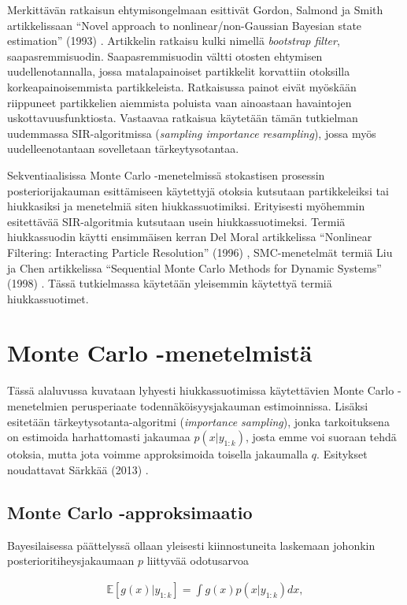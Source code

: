 \documentclass[
  12pt,
  a4paper, twoside]{book}
\begin{document}
Merkittävän ratkaisun ehtymisongelmaan esittivät Gordon, Salmond ja Smith artikkelissaan ``Novel approach to nonlinear/non-Gaussian Bayesian state estimation'' (1993) \citep{Gordon-1993}. Artikkelin ratkaisu kulki nimellä \emph{bootstrap filter}, saapasremmisuodin. Saapasremmisuodin vältti otosten ehtymisen uudellenotannalla, jossa matalapainoiset partikkelit korvattiin otoksilla korkeapainoisemmista partikkeleista. Ratkaisussa painot eivät myöskään riippuneet partikkelien aiemmista poluista vaan ainoastaan havaintojen uskottavuusfunktiosta. Vastaavaa ratkaisua käytetään tämän tutkielman uudemmassa SIR-algoritmissa (\emph{sampling importance resampling}), jossa myös uudelleenotantaan sovelletaan tärkeytysotantaa.

Sekventiaalisissa Monte Carlo -menetelmissä stokastisen prosessin posteriorijakauman esittämiseen käytettyjä otoksia kutsutaan partikkeleiksi tai hiukkasiksi ja menetelmiä siten hiukkassuotimiksi. Erityisesti myöhemmin esitettävää SIR-algoritmia kutsutaan usein hiukkassuotimeksi. Termiä hiukkassuodin käytti ensimmäisen kerran Del Moral artikkelissa ``Nonlinear Filtering: Interacting Particle Resolution'' (1996) \citep{DelMoral-1996}, SMC-menetelmät termiä Liu ja Chen artikkelissa ``Sequential Monte Carlo Methods for Dynamic Systems'' (1998) \citep{Liu-1998}. Tässä tutkielmassa käytetään yleisemmin käytettyä termiä hiukkassuotimet.

\section{Monte Carlo -menetelmistä}

Tässä alaluvussa kuvataan lyhyesti hiukkassuotimissa käytettävien Monte Carlo -menetelmien perusperiaate todennäköisyysjakauman estimoinnissa. Lisäksi esitetään tärkeytysotanta-algoritmi (\emph{importance sampling}), jonka tarkoituksena on estimoida harhattomasti jakaumaa \(p(x|y_{1:k})\), josta emme voi suoraan tehdä otoksia, mutta jota voimme approksimoida toisella jakaumalla \(q\). Esitykset noudattavat Särkkää (2013) \citep{sarkka-2013}.

\subsection{Monte Carlo -approksimaatio}

Bayesilaisessa päättelyssä ollaan yleisesti kiinnostuneita laskemaan johonkin posterioritiheysjakaumaan \(p\) liittyvää odotusarvoa

\begin{align}
\mathbb{E}[g(x)|y_{1:k}]=\int g(x)p(x|y_{1:k})dx,
\end{align}
\end{document}
